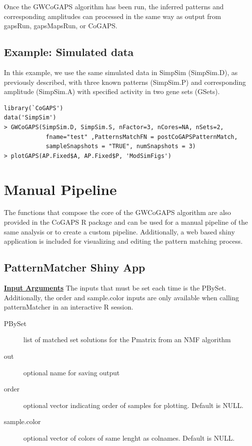 \documentclass{report}
\begin{document}
\par Once the GWCoGAPS algorithm has been run, the inferred patterns and corresponding amplitudes can processed in the same way as output from gapsRun, gapsMapsRun, or CoGAPS.

\subsection{Example: Simulated data}

\par In this example, we use the same simulated data in SimpSim (SimpSim.D), as previously described, with three known patterns (SimpSim.P) and corresponding amplitude (SimpSim.A) with specified activity in two gene sets (GSets).

\begin{verbatim}
library(`CoGAPS')
data('SimpSim')
> GWCoGAPS(SimpSim.D, SimpSim.S, nFactor=3, nCores=NA, nSets=2,
            fname="test" ,PatternsMatchFN = postCoGAPSPatternMatch,
            sampleSnapshots = "TRUE", numSnapshots = 3)
> plotGAPS(AP.Fixed$A, AP.Fixed$P, 'ModSimFigs')
\end{verbatim}


\section{Manual Pipeline} \label{manpipe}

\par The functions that compose the core of the GWCoGAPS algorithm are also provided in the CoGAPS R package and can be used for a manual pipeline of the same analysis or to create a custom pipeline. Additionally, a web based shiny application is included for visualizing and editing the pattern matching process.

\subsection{PatternMatcher Shiny App}

\par \noindent \textbf{\underline{Input Arguments}}
The inputs that must be set each time is the PBySet. Additionally, the order and sample.color inputs are only available when calling patternMatcher in an interactive R session.

\begin{description}
\item[PBySet]{list of matched set solutions for the Pmatrix from an NMF algorithm}
\item[out]{optional name for saving output}
\item[order]{optional vector indicating order of samples for plotting. Default is NULL.}
\item[sample.color]{optional vector of colors of same lenght as colnames. Default is NULL.}
\end{description}
\end{document}
